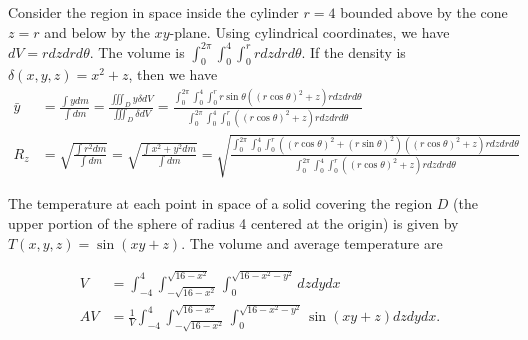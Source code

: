 \begin{example}
  Consider the region in space inside the cylinder $r=4$ bounded above
  by the cone $z=r$ and below by the $xy$-plane.  Using cylindrical
  coordinates, we have $dV = rdzdrd\theta$. The volume is
  $\int_{0}^{2\pi}\int_0^4\int_0^r rdzdrd\theta$.  If the density is
  $\delta(x,y,z) =x^2+z$, then we have
  \begin{align*}
    \bar y &= \frac{\int y dm}{\int dm}= \frac{\iiint_D y \delta
      dV}{\iiint_D \delta dV}= \frac{\int_{0}^{2\pi}\int_0^4\int_0^r
      r\sin\theta((r\cos\theta)^2+z)rdzdrd\theta}
    {\int_{0}^{2\pi}\int_0^4\int_0^r ((r\cos\theta)^2+z) rdzdrd\theta}\\
    R_z &= \sqrt{\frac{\int r^2 dm}{\int dm}} =\sqrt{\frac{\int
        x^2+y^2 dm}{\int dm}} = \sqrt{\frac
      {\int_{0}^{2\pi}\int_0^4\int_0^r((r\cos\theta)^2+(r\sin\theta)^2)
        ((r\cos\theta)^2+z) rdzdrd\theta}
      {\int_{0}^{2\pi}\int_0^4\int_0^r ((r\cos\theta)^2+z)
        rdzdrd\theta}}
  \end{align*}
\end{example}

\begin{example}
  The temperature at each point in space of a solid covering the
  region {$D$} (the upper portion of the sphere of radius 4 centered
  at the origin) is given by $T(x,y,z) = \sin(xy+z)$.  The volume and
  average temperature are

\begin{align*}
  V&=\int_{-4}^{4} \int_{-\sqrt{16-x^2}}^{\sqrt{16-x^2}}
  \int_{0}^{\sqrt{16-x^2-y^2}} dz dy dx\\
  AV&=\frac{1}{V}\int_{-4}^{4} \int_{-\sqrt{16-x^2}}^{\sqrt{16-x^2}}
  \int_{0}^{\sqrt{16-x^2-y^2}} \sin(xy+z) dz dy dx.
\end{align*}
\end{example}










